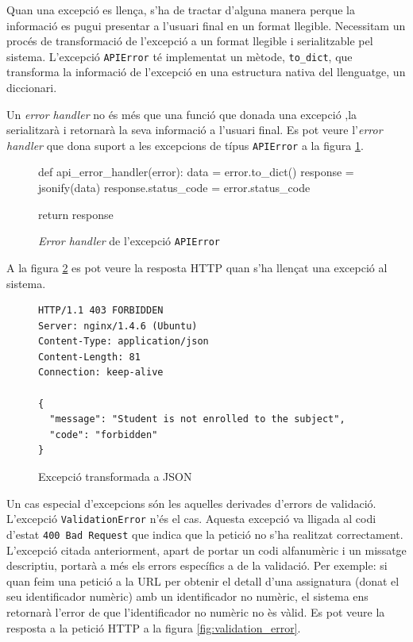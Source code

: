 Quan una excepció es llença, s'ha de tractar d'alguna manera perque la informació es pugui presentar a l'usuari final en un format llegible. Necessitam un procés de transformació de l'excepció a un format llegible i serialitzable pel sistema. L'excepció \texttt{APIError} té implementat un mètode, \texttt{to\_dict}, que transforma la informació de l'excepció en una estructura nativa del llenguatge, un diccionari.

Un \emph{error handler} no és més que una funció que donada una excepció ,la serialitzarà i retornarà la seva informació a l'usuari final. Es pot veure l'\emph{error handler} que dona suport a les excepcions de típus \texttt{APIError} a la figura \ref{fig:error_handler}.\\

\begin{figure}[h!]
	\begin{python}
def api_error_handler(error):
	data = error.to_dict()
	response = jsonify(data)
	response.status_code = error.status_code
	
	return response
	\end{python}
	\caption{\emph{Error handler} de l'excepció \texttt{APIError}}
	\label{fig:error_handler}

\end{figure}

A la figura \ref{fig:excepcio_json} es pot veure la resposta \ac{HTTP} quan s'ha llençat una excepció al sistema.

\begin{figure}[h!]
	\begin{verbatim}
HTTP/1.1 403 FORBIDDEN
Server: nginx/1.4.6 (Ubuntu)
Content-Type: application/json
Content-Length: 81
Connection: keep-alive

{
  "message": "Student is not enrolled to the subject", 
  "code": "forbidden"
}
	\end{verbatim}
	\caption{Excepció transformada a \ac{JSON}}
	\label{fig:excepcio_json}
\end{figure}

Un cas especial d'excepcions són les aquelles derivades d'errors de validació. L'excepció \texttt{ValidationError} n'és el cas. Aquesta excepció va lligada al codi d'estat \texttt{400 Bad Request} que indica que la petició no s'ha realitzat correctament.\\

L'excepció citada anteriorment, apart de portar un codi alfanumèric i un missatge descriptiu, portarà a més els errors específics a de la validació. Per exemple: si quan feim una petició a la \ac{URL} per obtenir el detall d'una assignatura (donat el seu identificador numèric) amb un identificador no numèric, el sistema ens retornarà l'error de que l'identificador no numèric no ès vàlid. Es pot veure la resposta a la petició \ac{HTTP} a la figura \ref{fig:validation_error}.\\

